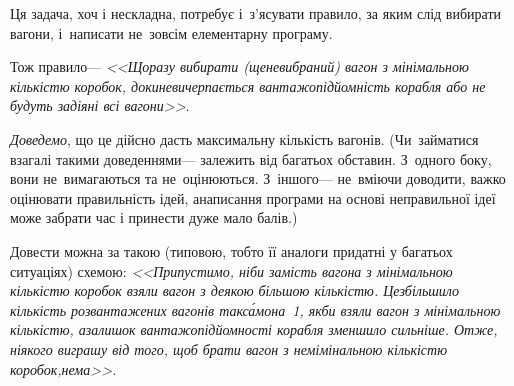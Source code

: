 \Tutorial	Ця задача, хоч і нескладна, потребує і~з'ясувати правило, за яким слід вибирати вагони, і~написати не~зовсім елементарну програму. 

{



}

Тож правило\nolinebreak[3] --- \textsl{<<Щоразу вибирати (ще\nolinebreak[3] не\nolinebreak[3] вибраний) вагон з мінімальною кількістю коробок, доки\nolinebreak[3] не\nolinebreak[3] вичерпається вантажопідйомність корабля або не будуть задіяні всі вагони>>}.

\emph{Доведемо}, що це дійсно дасть максимальну кількість вагонів. (Чи~займатися взагалі такими доведеннями\nolinebreak[3] --- залежить від багатьох обставин. З~одного боку, вони не~вимагаються та не~оцінюються. З~іншого\nolinebreak[3] --- не~вміючи доводити, важко оцінювати правильність ідей, а\nolinebreak[3] написання програми на основі неправильної ідеї може забрати час і принести дуже мало балів.) 

Довести можна за такою (типовою, тобто її аналоги придатні у багатьох ситуаціях) схемою: \textsl{<<Припустимо, ніби замість вагона з мінімальною кількістю коробок взяли вагон з деякою більшою кількістю. Це\nolinebreak[3] збільшило кількість розвантажених вагонів так\nolinebreak[3] с\'{а}мо\nolinebreak[1] на~1, якби взяли вагон з мінімальною кількістю, а\nolinebreak[3] залишок вантажопідйомності корабля зменшило сильніше. Отже, ніякого виграшу від того, щоб брати вагон з немімінальною кількістю коробок,\nolinebreak[1] \mbox{нема}>>.} 


